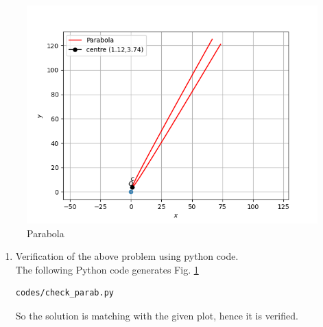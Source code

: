 \documentclass[journal,12pt,twocolumn]{IEEEtran}
\renewcommand\thesection{\arabic{section}}
\begin{document}
\begin{figure}[!ht]
\centering
\includegraphics[width=\columnwidth]{./figs/parabola_2.png}
\caption{Parabola}
\label{fig:parabola}
\end{figure}

\renewcommand{\theequation}{\theenumi}
\begin{enumerate}[label=\thesection.\arabic*.,ref=\thesection.\theenumi]
\item Verification of the above problem using python code.\\
\solution The  following Python code generates Fig. \ref{fig:parabola}
\begin{lstlisting}
codes/check_parab.py
\end{lstlisting}

So the solution is matching with the given plot, hence it is verified.
%
\end{enumerate}
\end{document}
